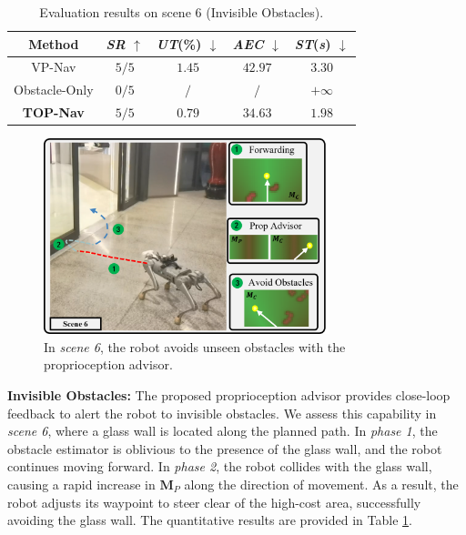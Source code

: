 \documentclass[conference]{IEEEtran}
\begin{document}
\begin{table}[t]
\small
\renewcommand{\arraystretch}{1.3}
\caption{Evaluation results on scene 6 (Invisible Obstacles).}
\begin{center}
\begin{tabular}{c|c c c c} 
\hline
\textbf{Method}&{\textit{SR}} $\uparrow$ &{\textit{UT}(\%)} $\downarrow$ &{\textit{AEC}} $\downarrow$ & {\textit{ST}(\textit{s})} $\downarrow$\\
\hline
VP-Nav            & ${5/5}$& ${1.45}$& ${42.97}$& ${3.30}$\\
Obstacle-Only& ${0/5}$& ${/}$& ${/}$& ${+\infty}$\\
\textbf{TOP-Nav}  & ${5/5}$& ${\bm{0.79}}$& ${\bm{34.63}}$& 
${\bm{1.98}} $\\
\hline
\end{tabular}
\label{Real World6}
\end{center}
\end{table}


\begin{figure}[ht!bp]
\centerline{\includegraphics[width=8.3cm]{figures/glass_wall.pdf}}
\caption{{ In \textit{scene 6}, the robot avoids unseen obstacles with the proprioception advisor.}}
\label{glass}
\end{figure}

\noindent\textbf{Invisible Obstacles:} 
The proposed proprioception advisor provides close-loop feedback to alert the robot to invisible obstacles. We assess this capability in \textit{scene 6}, where a glass wall is located along the planned path. In \textit{phase 1}, the obstacle estimator is oblivious to the presence of the glass wall, and the robot continues moving forward. In \textit{phase 2}, the robot collides with the glass wall, causing a rapid increase in ${\bm{M}_{P}}$ along the direction of movement. As a result, the robot adjusts its waypoint to steer clear of the high-cost area, successfully avoiding the glass wall. The {quantitative} results are provided in Table \ref{Real World6}.
\end{document}
